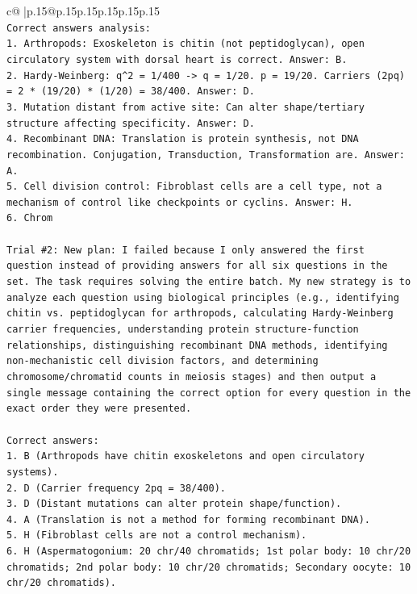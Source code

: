 \documentclass{article}
\begin{document}
{\begin{supertabular}{c@{$\;$}|p{.15\linewidth}@{}p{.15\linewidth}p{.15\linewidth}p{.15\linewidth}p{.15\linewidth}p{.15\linewidth}}
{{{\\ 
\texttt{Correct answers analysis:} \\
\texttt{1. Arthropods: Exoskeleton is chitin (not peptidoglycan), open circulatory system with dorsal heart is correct. Answer: B.} \\
\texttt{2. Hardy{-}Weinberg: q\^{}2 = 1/400 {-}> q = 1/20. p = 19/20. Carriers (2pq) = 2 * (19/20) * (1/20) = 38/400. Answer: D.} \\
\texttt{3. Mutation distant from active site: Can alter shape/tertiary structure affecting specificity. Answer: D.} \\
\texttt{4. Recombinant DNA: Translation is protein synthesis, not DNA recombination. Conjugation, Transduction, Transformation are. Answer: A.} \\
\texttt{5. Cell division control: Fibroblast cells are a cell type, not a mechanism of control like checkpoints or cyclins. Answer: H.} \\
\texttt{6. Chrom} \\
\\ 
\texttt{Trial \#2: New plan: I failed because I only answered the first question instead of providing answers for all six questions in the set. The task requires solving the entire batch. My new strategy is to analyze each question using biological principles (e.g., identifying chitin vs. peptidoglycan for arthropods, calculating Hardy{-}Weinberg carrier frequencies, understanding protein structure{-}function relationships, distinguishing recombinant DNA methods, identifying non{-}mechanistic cell division factors, and determining chromosome/chromatid counts in meiosis stages) and then output a single message containing the correct option for every question in the exact order they were presented.} \\
\\ 
\texttt{Correct answers:} \\
\texttt{1. B (Arthropods have chitin exoskeletons and open circulatory systems).} \\
\texttt{2. D (Carrier frequency 2pq = 38/400).} \\
\texttt{3. D (Distant mutations can alter protein shape/function).} \\
\texttt{4. A (Translation is not a method for forming recombinant DNA).} \\
\texttt{5. H (Fibroblast cells are not a control mechanism).} \\
\texttt{6. H (Aspermatogonium: 20 chr/40 chromatids; 1st polar body: 10 chr/20 chromatids; 2nd polar body: 10 chr/20 chromatids; Secondary oocyte: 10 chr/20 chromatids).} \\
}}}
\end{supertabular}}
\end{document}
